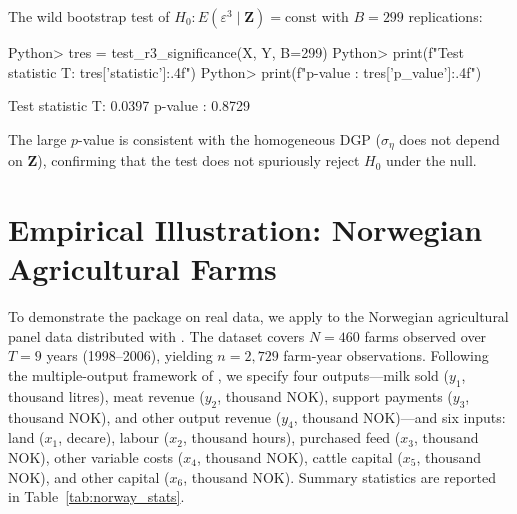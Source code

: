 \documentclass[article]{jss}
\begin{document}
The wild bootstrap test of $H_0: E(\varepsilon^3 \mid \mathbf{Z}) =
\mathrm{const}$ \citep{PSVKZ2024} with $B = 299$ replications:
%
\begin{CodeChunk}
\begin{CodeInput}
Python> tres = test_r3_significance(X, Y, B=299)
Python> print(f"Test statistic T: {tres['statistic']:.4f}")
Python> print(f"p-value         : {tres['p_value']:.4f}")
\end{CodeInput}
\begin{CodeOutput}
Test statistic T: 0.0397
p-value         : 0.8729
\end{CodeOutput}
\end{CodeChunk}

The large $p$-value is consistent with the homogeneous DGP
($\sigma_\eta$ does not depend on $\mathbf{Z}$), confirming that the
test does not spuriously reject $H_0$ under the null.



\section[Empirical illustration]{Empirical Illustration: Norwegian Agricultural Farms}
\label{sec:empirical}

To demonstrate the package on real data, we apply  to the
Norwegian agricultural panel data distributed with \citet{Kumbhakar2015}.
The dataset covers $N = 460$ farms observed over $T = 9$ years (1998--2006),
yielding $n = 2{,}729$ farm-year observations.
Following the multiple-output framework of \citet{SimarWilson2023}, we specify
four outputs---milk sold ($y_1$, thousand litres), meat revenue ($y_2$,
thousand NOK), support payments ($y_3$, thousand NOK), and other output
revenue ($y_4$, thousand NOK)---and six inputs: land ($x_1$, decare),
labour ($x_2$, thousand hours), purchased feed ($x_3$, thousand NOK),
other variable costs ($x_4$, thousand NOK), cattle capital ($x_5$,
thousand NOK), and other capital ($x_6$, thousand NOK).
Summary statistics are reported in Table~\ref{tab:norway_stats}.
\end{document}
